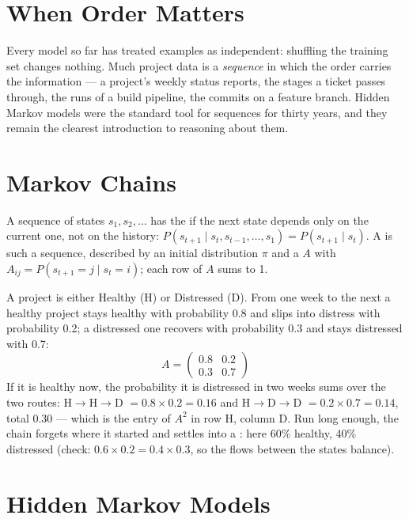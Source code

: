 \section{When Order Matters}

Every model so far has treated examples as independent: shuffling the training
set changes nothing. Much project data is a \emph{sequence} in which the order
carries the information --- a project's weekly status reports, the stages a ticket
passes through, the runs of a build pipeline, the commits on a feature branch.
Hidden Markov models were the standard tool for sequences for thirty years, and they
remain the clearest introduction to reasoning about them.

\section{Markov Chains}

\begin{definitionbox}
A sequence of states $s_1, s_2, \dots$ has the  if the next
state depends only on the current one, not on the history:
$P(s_{t+1} \mid s_t, s_{t-1}, \dots, s_1) = P(s_{t+1} \mid s_t)$. A  is such a sequence, described by an initial distribution $\pi$ and a
 $A$ with $A_{ij} = P(s_{t+1} = j \mid s_t = i)$; each row
of $A$ sums to 1.
\end{definitionbox}

A project is either Healthy (H) or Distressed (D). From one week to the next a
healthy project stays healthy with probability 0.8 and slips into distress with
probability 0.2; a distressed one recovers with probability 0.3 and stays
distressed with 0.7:
\[
A = \begin{pmatrix} 0.8 & 0.2 \\ 0.3 & 0.7 \end{pmatrix}
\]
If it is healthy now, the probability it is distressed in two weeks sums over the
two routes: H$\to$H$\to$D $= 0.8 \times 0.2 = 0.16$ and H$\to$D$\to$D $= 0.2 \times 0.7
= 0.14$, total 0.30 --- which is the entry of $A^2$ in row H, column D. Run long
enough, the chain forgets where it started and settles into a : here 60\% healthy, 40\% distressed (check: $0.6 \times 0.2 = 0.4
\times 0.3$, so the flows between the states balance).

\section{Hidden Markov Models}

